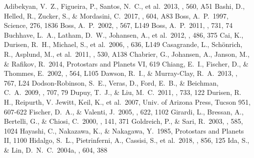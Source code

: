 \documentclass[twocolumn, dvipdfmx]{aastex62}
\begin{document}
\begin{CJK*}{UTF8}{min}

\clearpage


\begin{thebibliography}{}

 Adibekyan, V.~Z., Figueira, P., Santos, N.~C., et al.\ 2013, \aap, 560, A51
 Bashi, D., Helled, R., Zucker, S., \& Mordasini, C.\ 2017, \aap, 604, A83
 Boss, A.~P.\ 1997, Science, 276, 1836
 Boss, A.~P.\ 2002, \apjl, 567, L149
 Boss, A.~P.\ 2011, \apj, 731, 74
 Buchhave, L.~A., Latham, D.~W., Johansen, A., et al.\ 2012, \nat, 486, 375
 Cai, K., Durisen, R.~H., Michael, S., et al.\ 2006, \apjl, 636, L149
 Casagrande, L., Sch{\"o}nrich, R., Asplund, M., et al.\ 2011, \aap, 530, A138
 Chabrier, G., Johansen, A., Janson, M., \& Rafikov, R.\ 2014, Protostars and Planets VI, 619
 Chiang, E.~I., Fischer, D., \& Thommes, E.\ 2002, \apjl, 564, L105
 Dawson, R.~I., \& Murray-Clay, R.~A.\ 2013, \apjl, 767, L24
 Dodson-Robinson, S.~E., Veras, D., Ford, E.~B., \& Beichman, C.~A.\ 2009, \apj, 707, 79
 Dupuy, T.~J., \& Liu, M.~C.\ 2011, \apj, 733, 122
 Durisen, R. H., Reipurth, V. Jewitt, Keil, K., et al.\ 2007, Univ. of Arizona Press, Tucson 951, 607-622
 Fischer, D.~A., \& Valenti, J.\ 2005, \apj, 622, 1102
 Girardi, L., Bressan, A., Bertelli, G., \& Chiosi, C.\ 2000, \aaps, 141, 371
 Goldreich, P., \& Sari, R.\ 2003, \apj, 585, 1024
 Hayashi, C., Nakazawa, K., \& Nakagawa, Y.\ 1985, Protostars and Planets II, 1100
 Hidalgo, S.~L., Pietrinferni, A., Cassisi, S., et al.\ 2018, \apj, 856, 125
 Ida, S., \& Lin, D.~N.~C.\ 2004a, \apj, 604, 388

\end{thebibliography}
\end{CJK*}
\end{document}
